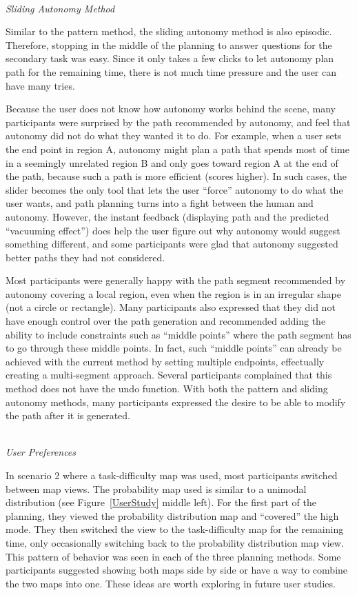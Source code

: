 \documentclass[lettersize, apacite, twoside, HRI]{apa_HRI}
\begin{document}
~\\ \noindent \textit{Sliding Autonomy Method}

Similar to the pattern method, the sliding autonomy method is also episodic. Therefore, stopping in the middle of the planning to answer questions for the secondary task was easy. Since it only takes a few clicks to let autonomy plan path for the remaining time, there is not much time pressure and the user can have many tries. 

Because the user does not know how autonomy works behind the scene, many participants were surprised by the path recommended by autonomy, and feel that autonomy did not do what they wanted it to do. For example, when a user sets the end point in region A, autonomy might plan a path that spends most of time in a seemingly unrelated region B and only goes toward region A at the end of the path, because such a path is more efficient (scores higher). In such cases, the slider becomes the only tool that lets the user ``force'' autonomy to do what the user wants, and path planning turns into a fight between the human and autonomy. However, the instant feedback (displaying path and the predicted ``vacuuming effect'') does help the user figure out why autonomy would suggest something different, and some participants were glad that autonomy suggested better paths they had not considered. 

Most participants were generally happy with the path segment recommended by autonomy covering a local region, even when the region is in an irregular shape (not a circle or rectangle). Many participants also expressed that they did not have enough control over the path generation and recommended adding the ability to include constraints such as ``middle points'' where the path segment has to go through these middle points. In fact, such ``middle points'' can already be achieved with the current method by setting multiple endpoints, effectually creating a multi-segment approach. Several participants complained that this method does not have the undo function. With both the pattern and sliding autonomy methods, many participants expressed the desire to be able to modify the path after it is generated.

~\\ \noindent \textit{User Preferences}

In scenario 2 where a task-difficulty map was used, most participants switched between map views. The probability map used is similar to a unimodal distribution (see Figure~\ref{UserStudy} middle left). For the first part of the planning, they viewed the probability distribution map and ``covered'' the high mode. They then switched the view to the task-difficulty map for the remaining time, only occasionally switching back to the probability distribution map view. This pattern of behavior was seen in each of the three planning methods. Some participants suggested showing both maps side by side or have a way to combine the two maps into one. These ideas are worth exploring in future user studies.
\end{document}
